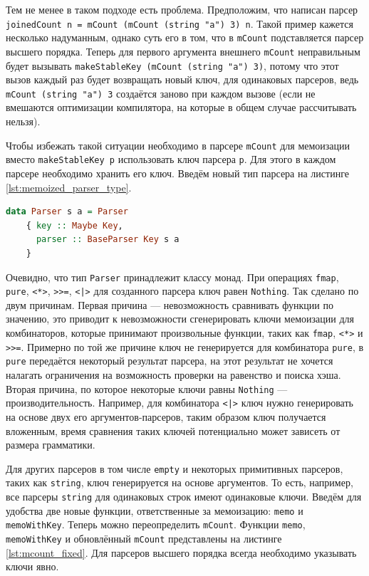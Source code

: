 \documentclass[times]{itmo-student-thesis}
\begin{document}
Тем не менее в таком подходе есть проблема. Предположим, что написан парсер \lstinline{joinedCount n = mCount (mCount (string "a") 3) n}.
Такой пример кажется несколько надуманным, однако суть его в том, что в \lstinline{mCount} подставляется парсер высшего порядка.
Теперь для первого аргумента внешнего \lstinline{mCount} неправильным будет вызывать \lstinline{makeStableKey (mCount (string "a") 3)}, потому что
этот вызов каждый раз будет возвращать новый ключ, для одинаковых парсеров, ведь \lstinline{mCount (string "a") 3} создаётся заново при каждом вызове
(если не вмешаются оптимизации компилятора, на которые в общем случае рассчитывать нельзя).

Чтобы избежать такой ситуации необходимо в парсере \lstinline{mCount} для мемоизации вместо \lstinline{makeStableKey p}
использовать ключ парсера \lstinline{p}. Для этого в каждом парсере необходимо хранить его ключ. Введём новый тип парсера на листинге \ref{lst:memoized_parser_type}. 

\begin{lstlisting}[language=Haskell,float=!h,caption={Тип парсера с ключом},label={lst:memoized_parser_type}]
  data Parser s a = Parser
    { key :: Maybe Key,
      parser :: BaseParser Key s a
    }
\end{lstlisting}

Очевидно, что тип \lstinline{Parser} принадлежит классу монад. При операциях \lstinline{fmap},
\lstinline{pure}, \lstinline{<*>}, \lstinline{>>=}, \lstinline{<|>} для созданного парсера
ключ равен \lstinline{Nothing}. Так сделано по двум причинам. Первая причина --- невозможность сравнивать функции по
значению, это приводит к невозможности сгенерировать ключи мемоизации для комбинаторов, которые принимают произвольные
функции, таких как \lstinline{fmap}, \lstinline{<*>} и \lstinline{>>=}. Примерно по той же причине ключ не
генерируется для  комбинатора \lstinline{pure}, в \lstinline{pure} передаётся некоторый результат парсера, на этот
результат не хочется налагать ограничения на возможность проверки на равенство и поиска хэша. Вторая причина, по
которое некоторые ключи равны \lstinline{Nothing} --- производительность. Например, для комбинатора \lstinline{<|>}
ключ нужно генерировать на основе двух его аргументов-парсеров, таким образом ключ получается вложенным, время сравнения таких ключей потенциально 
может зависеть от размера грамматики. 

Для других парсеров в том числе \lstinline{empty} и некоторых примитивных парсеров, таких как
\lstinline{string}, ключ генерируется на основе аргументов. То есть, например, все парсеры \lstinline{string} для
одинаковых строк имеют одинаковые ключи. Введём для удобства две новые функции, ответственные за мемоизацию:
\lstinline{memo} и \lstinline{memoWithKey}. Теперь можно переопределить
\lstinline{mCount}. Функции \lstinline{memo}, \lstinline{memoWithKey} и обновлённый \lstinline{mCount} представлены на
листинге \ref{lst:mcount_fixed}. Для парсеров высшего порядка всегда необходимо указывать ключи явно.
\end{document}

